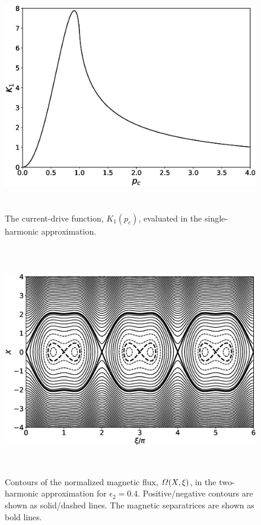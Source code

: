 \documentclass[12pt,prb,aps]{revtex4-1}
\begin{document}
\begin{figure}
\centerline{\includegraphics[height=4in]{Figure2.eps}}
\caption{The current-drive function, $K_1(p_c)$, evaluated in the single-harmonic approximation.}\label{fig2}
\end{figure}

\begin{figure}
\centerline{\includegraphics[height=4in]{Figure3.eps}}
\caption{Contours of the normalized magnetic flux, ${\mit\Omega}(X,\xi)$, in the two-harmonic approximation for 
$\epsilon_2=0.4$. Positive/negative contours are shown as solid/dashed lines. The magnetic separatrices are shown
as  bold lines.}\label{fig3}
\end{figure}
\end{document}
